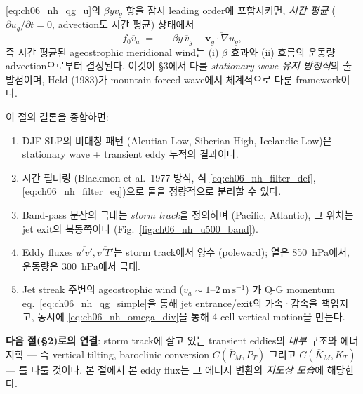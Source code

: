 
\begin{remark}
\eqref{eq:ch06_nh_qg_u}의 $\beta y v_g$ 항을 잠시 leading order에 포함시키면,
\textit{시간 평균} ($\partial u_g/\partial t = 0$, advection도 시간 평균) 상태에서
\begin{equation}\label{eq:ch06_nh_meanbalance}
  f_0 \overline{v}_a \;=\; -\,\beta y\,\overline{v}_g
  + \overline{\mathbf{v}_g\cdot\nabla u_g},
\end{equation}
즉 시간 평균된 ageostrophic meridional wind는 (i) $\beta$ 효과와 (ii) 흐름의
운동량 advection으로부터 결정된다.  이것이 §3에서 다룰 \textit{stationary
wave 유지 방정식}의 출발점이며, Held (1983)가 mountain-forced wave에서
체계적으로 다룬 framework이다.
\end{remark}

\begin{hisublock}
이 절의 결론을 종합하면:
\begin{enumerate}
  \item DJF SLP의 비대칭 패턴 (Aleutian Low, Siberian High, Icelandic Low)은
        stationary wave + transient eddy 누적의 결과이다.
  \item 시간 필터링 (Blackmon et al.\ 1977 방식, 식
        \eqref{eq:ch06_nh_filter_def}, \eqref{eq:ch06_nh_filter_eq})으로
        둘을 정량적으로 분리할 수 있다.
  \item Band-pass 분산의 극대는 \textit{storm track}을 정의하며 (Pacific,
        Atlantic), 그 위치는 jet exit의 북동쪽이다 (Fig.~\ref{fig:ch06_nh_u500_band}).
  \item Eddy fluxes $\overline{u'v'}, \overline{v'T'}$는 storm track에서
        양수 (poleward); 열은 850~hPa에서, 운동량은 300~hPa에서 극대.
  \item Jet streak 주변의 ageostrophic wind ($v_a \sim 1$--$2~\mathrm{m\,s^{-1}}$)
        가 Q-G momentum eq.\ \eqref{eq:ch06_nh_qg_simple}을 통해 jet
        entrance/exit의 가속·감속을 책임지고, 동시에
        \eqref{eq:ch06_nh_omega_div}을 통해 4-cell vertical motion을 만든다.
\end{enumerate}

\medskip
\textbf{다음 절(§2)로의 연결}: storm track에 살고 있는 transient eddies의
\textit{내부} 구조와 에너지학 — 즉 vertical tilting, baroclinic conversion
$C(\overline{P}_M, P_T)$ 그리고 $C(\overline{K}_M, K_T)$ — 를 다룰 것이다.
본 절에서 본 eddy flux는 그 에너지 변환의 \textit{지도상 모습}에 해당한다.
\end{hisublock}

